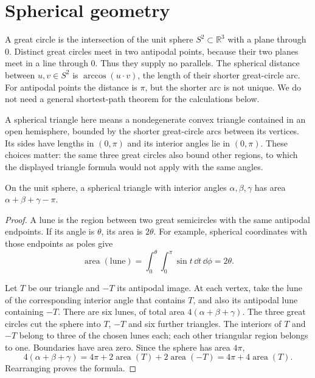 \section{Spherical geometry}

A great circle is the intersection of the unit sphere $S^2\subset\mathbb R^3$
with a plane through $0$. Distinct great circles meet in two antipodal points,
because their two planes meet in a line through $0$. Thus they supply no
parallels. The spherical distance between $u,v\in S^2$ is
$\arccos(u\cdot v)$, the length of their shorter great-circle arc.
For antipodal points the distance is $\pi$, but the shorter arc is not unique.
We do not need a general shortest-path theorem for the calculations below.

A spherical triangle here means a nondegenerate convex triangle contained
in an open hemisphere, bounded by the shorter great-circle arcs between
its vertices. Its sides have lengths in $(0,\pi)$ and its interior angles
lie in $(0,\pi)$. These choices matter: the same three great circles also
bound other regions, to which the displayed triangle formula would not
apply with the same angles.

\begin{theorem}[Girard, 1629]\label{geometry:thm:girard}
On the unit sphere, a spherical triangle with interior angles
$\alpha,\beta,\gamma$ has area $\alpha+\beta+\gamma-\pi$.
\end{theorem}
\begin{proof}
A lune is the region between two great semicircles with the same antipodal
endpoints. If its angle is $\theta$, its area is $2\theta$.
For example, spherical coordinates with those endpoints as poles give
\[
 \operatorname{area}(\text{lune})
 =\int_0^\theta\int_0^\pi\sin t\,\dd t\,\dd\phi=2\theta.
\]

Let $T$ be our triangle and $-T$ its antipodal image. At each vertex, take
the lune of the corresponding interior angle that contains $T$, and also
its antipodal lune containing $-T$. There are six lunes, of total area
$4(\alpha+\beta+\gamma)$. The three great circles cut the sphere into
$T$, $-T$ and six further triangles. The interiors of $T$ and $-T$ belong
to three of the chosen lunes each; each other triangular region belongs
to one. Boundaries have area zero. Since the sphere has area $4\pi$,
\[
 4(\alpha+\beta+\gamma)
 =4\pi+2\operatorname{area}(T)+2\operatorname{area}(-T)
 =4\pi+4\operatorname{area}(T).
\]
Rearranging proves the formula.
\end{proof}

